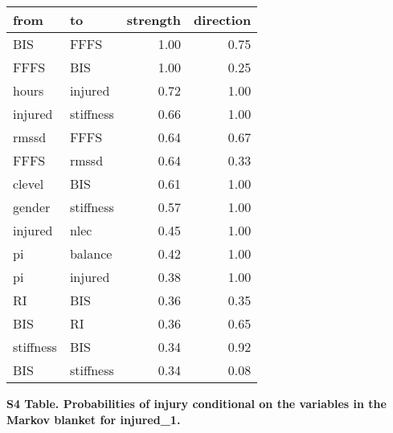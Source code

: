 \documentclass[
]{article}
\begin{document}
\begin{longtable}[t]{l|l|r|r}
\caption{\label{tab:unnamed-chunk-4}}\\
\hline
from & to & strength & direction\\
\hline
BIS & FFFS & 1.00 & 0.75\\
\hline
FFFS & BIS & 1.00 & 0.25\\
\hline
hours & injured & 0.72 & 1.00\\
\hline
injured & stiffness & 0.66 & 1.00\\
\hline
rmssd & FFFS & 0.64 & 0.67\\
\hline
FFFS & rmssd & 0.64 & 0.33\\
\hline
clevel & BIS & 0.61 & 1.00\\
\hline
gender & stiffness & 0.57 & 1.00\\
\hline
injured & nlec & 0.45 & 1.00\\
\hline
pi & balance & 0.42 & 1.00\\
\hline
pi & injured & 0.38 & 1.00\\
\hline
RI & BIS & 0.36 & 0.35\\
\hline
BIS & RI & 0.36 & 0.65\\
\hline
stiffness & BIS & 0.34 & 0.92\\
\hline
BIS & stiffness & 0.34 & 0.08\\
\hline
\end{longtable}

\newpage

\textbf{S4 Table. Probabilities of injury conditional on the variables in the Markov blanket for injured\_1.}
\end{document}
